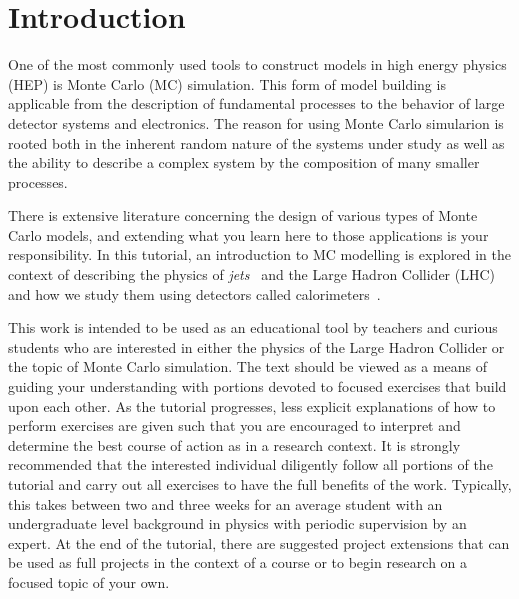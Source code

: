 \documentclass[UKenglish,texlive=2016]{\ATLASLATEXPATH atlasdoc}
\begin{document}
\maketitle


\newpage
\section{Introduction}
One of the most commonly used tools to construct models in high energy physics (HEP) is Monte Carlo (MC) simulation.  
This form of model building is applicable from the description of fundamental processes to the behavior of large detector systems and electronics.  The reason for using Monte Carlo simularion is rooted both in the inherent random nature of the systems under study as well as the ability to describe a complex system by the composition of many smaller processes.  

There is extensive literature concerning the design of various types of Monte Carlo models, and extending what you learn here to those applications is your responsibility.  In this tutorial, an introduction to MC modelling is explored in the context of describing the physics of \textit{jets}~\cite{Ellis:1276292,Ellis:2007ib} and the Large Hadron Collider (LHC)~\cite{Evans:2008zzb} and how we study them using detectors called calorimeters~\cite{Proudfoot:2006tr}.

This work is intended to be used as an educational tool by teachers and curious
students who are interested in either the physics of the Large Hadron Collider or the topic of Monte Carlo simulation.  The text should be viewed as a means of 
guiding your understanding with portions devoted to focused exercises that build 
upon each other.  As the tutorial progresses, less explicit explanations of how to perform exercises are given such that you are encouraged to interpret and determine the best course of action as in a research context.  It is strongly recommended that the interested individual diligently follow all portions of the tutorial and carry out all exercises to have the full benefits of the work.  Typically, this takes between two and three weeks for an average student with an undergraduate level background in physics with periodic supervision by an expert.  At the end of the tutorial, there are suggested project extensions that can be used as full projects in the context of a course or to begin research on a focused topic of your own.
\end{document}
